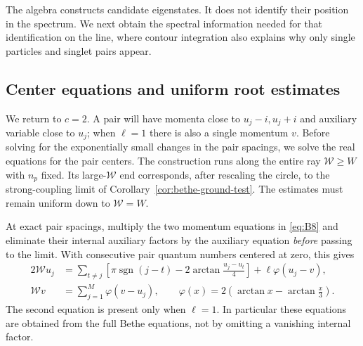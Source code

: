 The algebra constructs candidate eigenstates.  It does not identify their
position in the spectrum.  We next obtain the spectral information needed
for that identification on the line, where contour integration also
explains why only single particles and singlet pairs appear.



\subsection{Center equations and uniform root estimates}

We return to $c=2$.  A pair will have momenta close to $u_j-i,u_j+i$ and
auxiliary variable close to $u_j$; when $\ell=1$ there is also a single
momentum $v$.  Before solving for the exponentially small changes in the
pair spacings, we solve the real equations for the pair centers.  The
construction runs along the entire ray $\mathcal W\geq W$ with $n_p$ fixed.
Its large-$\mathcal W$ end corresponds, after rescaling the circle, to
the strong-coupling limit of Corollary~\ref{cor:bethe-ground-test}.
The estimates must remain uniform down to $\mathcal W=W$.

At exact pair spacings, multiply the two momentum equations in
\eqref{eq:B8} and eliminate their internal auxiliary factors by the
auxiliary equation \emph{before} passing to the limit.  With consecutive
pair quantum numbers centered at zero, this gives
\begin{equation}\label{eq:B13}
 \begin{split}
 2\mathcal W u_j
   &=\sum_{t\ne j}\left[
       \pi\operatorname{sgn}(j-t)
       -2\arctan\frac{u_j-u_t}{4}\right]
       +\ell\varphi(u_j-v),\\
 \mathcal W v&=\sum_{j=1}^M\varphi(v-u_j),
       \qquad
 \varphi(x)=2\left(\arctan x-\arctan\frac{x}{3}\right).
 \end{split}
\end{equation}
The second equation is present only when $\ell=1$.  In particular these
equations are obtained from the full Bethe equations, not by omitting a
vanishing internal factor.

